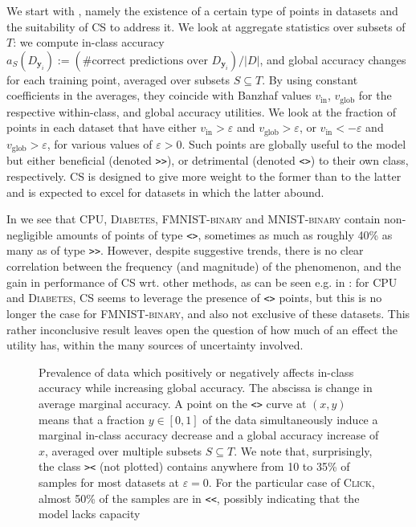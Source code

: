 \documentclass[10pt]{article}
\newcommand{\assign}{:=}
\newcommand{\tmmathbf}[1]{\ensuremath{\boldsymbol{#1}}}
\newcommand{\tmname}[1]{\textsc{#1}}
\newcommand{\tmop}[1]{\ensuremath{\operatorname{#1}}}
\newcommand{\tmtt}[1]{\texttt{#1}}
\begin{document}
We start with , namely the existence of a
certain type of points in datasets and the suitability of CS to address it. We
look at aggregate statistics over subsets of $T$: we compute in-class accuracy
$a_S  (D_{\tmmathbf{y}_i}) \assign \left( \text{\# correct predictions over }
D_{\tmmathbf{y}_i} \right) / |D|$, and global accuracy changes for each
training point, averaged over subsets $S \subseteq T$. By using constant
coefficients in the averages, they coincide with Banzhaf values
$v_{\tmop{in}}$, $v_{\tmop{glob}}$ for the respective within-class, and global
accuracy utilities. We look at the fraction of points in each dataset that
have either $v_{\tmop{in}} > \varepsilon$ and $v_{\tmop{glob}} > \varepsilon$,
or $v_{\tmop{in}} < - \varepsilon$ and $v_{\tmop{glob}} > \varepsilon$, for
various values of $\varepsilon > 0$. Such points are globally useful to the
model but either beneficial (denoted {\tmtt{>>}}), or detrimental (denoted
{\tmtt{<>}}) to their own class, respectively. CS is designed to give more
weight to the former than to the latter and is expected to excel for datasets
in which the latter abound.

In  we see that {\tmname{CPU}},
{\tmname{Diabetes}}, {\tmname{FMNIST-binary}} and {\tmname{MNIST-binary}}
contain non-negligible amounts of points of type {\tmtt{<>}}, sometimes as
much as roughly 40\% as many as of type {\tmtt{>>}}. However, despite
suggestive trends, there is no clear correlation between the frequency (and
magnitude) of the phenomenon, and the gain in performance of CS wrt. other
methods, as can be seen e.g. in : for
{\tmname{CPU}} and {\tmname{Diabetes}}, CS seems to leverage the presence of
{\tmtt{<>}} points, but this is no longer the case for
{\tmname{FMNIST-binary}}, and also not exclusive of these datasets. This
rather inconclusive result leaves open the question of how much of an effect
the utility  has, within the many sources of uncertainty
involved.

\begin{figure}[h]
  \caption{\label{fig:dataset-characteristics}Prevalence of data which
  positively or negatively affects in-class accuracy while increasing global
  accuracy. The abscissa is change in average marginal accuracy. A point on
  the {\tmtt{<>}} curve at $(x, y)$ means that a fraction $y \in [0, 1]$ of
  the data simultaneously induce a marginal in-class accuracy decrease and a
  global accuracy increase of $x$, averaged over multiple subsets $S \subseteq
  T$. We note that, surprisingly, the class {\tmtt{><}} (not plotted) contains
  anywhere from 10 to 35\% of samples for most datasets at $\varepsilon = 0$.
  For the particular case of {\tmname{Click}}, almost 50\% of the samples are
  in {\tmtt{<<}}, possibly indicating that the model lacks capacity}
\end{figure}
\end{document}
